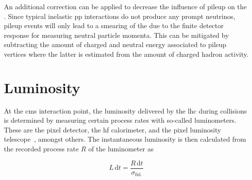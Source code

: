 
An additional correction can be applied to decrease the influence of pileup on the \met. Since typical inelastic \gls{pp} interactions do not produce any prompt neutrinos, pileup events will only lead to a smearing of the \met due to the finite detector response for measuring neutral particle momenta. This can be mitigated by subtracting the amount of charged and neutral energy associated to pileup vertices where the latter is estimated from the amount of charged hadron activity.


\section{Luminosity}

At the \gls{cms} interaction point, the luminosity delivered by the \gls{lhc} during collisions is determined by measuring certain process rates with so-called luminometers. These are the pixel detector, the \gls{hf} calorimeter, and the pixel luminosity telescope~\cite{Kornmayer:2039978}, amongst others. The instantaneous luminosity is then calculated from the recorded process rate $R$ of the luminometer as

\begin{equation}
L\,\mathrm{d}t=\frac{R\,\mathrm{d}t}{\sigma_\mathrm{fid.}}
\end{equation}

